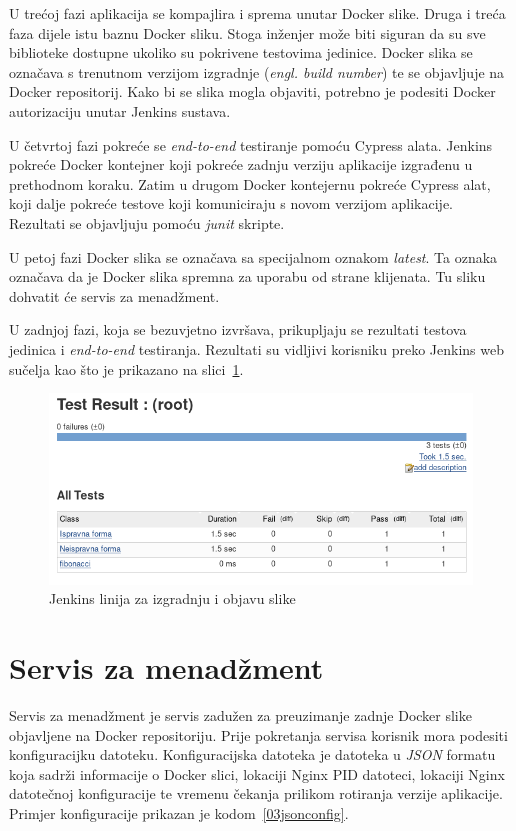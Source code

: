 U trećoj fazi aplikacija se kompajlira i sprema unutar Docker slike. Druga i treća faza dijele istu
baznu Docker sliku. Stoga inženjer može biti siguran da su sve biblioteke dostupne ukoliko su
pokrivene testovima jedinice. Docker slika se označava s trenutnom verzijom izgradnje (\textit{engl.
build number}) te se objavljuje na Docker repositorij. Kako bi se slika mogla objaviti, potrebno je
podesiti Docker autorizaciju unutar Jenkins sustava.

U četvrtoj fazi pokreće se \textit{end-to-end} testiranje pomoću Cypress alata. Jenkins pokreće
Docker kontejner koji pokreće zadnju verziju aplikacije izgrađenu u prethodnom koraku. Zatim u
drugom Docker kontejernu pokreće Cypress alat, koji dalje pokreće testove koji komuniciraju s
novom verzijom aplikacije. Rezultati se objavljuju pomoću \textit{junit} skripte.

U petoj fazi Docker slika se označava sa specijalnom oznakom \textit{latest}. Ta oznaka označava
da je Docker slika spremna za uporabu od strane klijenata. Tu sliku dohvatit će servis za
menadžment.

U zadnjoj fazi, koja se bezuvjetno izvršava, prikupljaju se rezultati testova jedinica i
\textit{end-to-end} testiranja. Rezultati su vidljivi korisniku preko Jenkins web sučelja kao što je
prikazano na slici~\ref{fig:03jenkins_result}.

\begin{figure}[h]
    \centering
    \includegraphics[width=\textwidth]{img/03/jenkins_result.png}
    \caption{Jenkins linija za izgradnju i objavu slike}%
    \label{fig:03jenkins_result}
\end{figure}

\section{Servis za menadžment}
Servis za menadžment je servis zadužen za preuzimanje zadnje Docker slike objavljene na Docker
repositoriju. Prije pokretanja servisa korisnik mora podesiti konfiguracijku datoteku.
Konfiguracijska datoteka je datoteka u \textit{JSON} formatu koja sadrži informacije o Docker slici,
lokaciji Nginx PID datoteci, lokaciji Nginx datotečnoj konfiguracije te vremenu čekanja prilikom
rotiranja verzije aplikacije. Primjer konfiguracije prikazan je kodom~\ref{03jsonconfig}.

